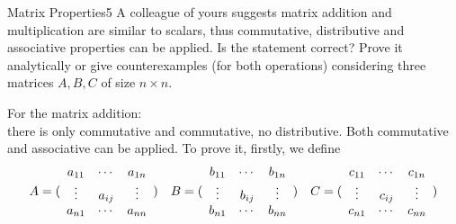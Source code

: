 \newif\ifvimbug
\vimbugfalse

\ifvimbug

\fi

 

\begin{questions}


\begin{question}{Matrix Properties}{5}
A colleague of yours suggests matrix addition and multiplication are similar to scalars, 
thus commutative, distributive and associative properties can be applied.
Is the statement correct? 
Prove it analytically or give counterexamples (for both operations) 
considering three matrices $ A, B, C$ of size $n\times n$.

\begin{answer}\end{answer}
    For the matrix addition:\\
    there is only commutative and commutative, no distributive.
    Both commutative and associative can be applied. To prove it, firstly, we define\\
    \begin{align*}
        A = ( \begin{array}{c c c} 
            a_{11} & \cdots & a_{1n} \\
            \vdots & a_{ij} & \vdots \\ 
            a_{n1} & \cdots & a_{nn} \end{array} )  \quad
        B = ( \begin{array}{c c c} 
            b_{11} & \cdots & b_{1n} \\
            \vdots & b_{ij} & \vdots \\
            b_{n1} & \cdots & b_{nn} \end{array} )  \quad
        C = ( \begin{array}{c c c} 
            c_{11} & \cdots & c_{1n} \\
            \vdots & c_{ij} & \vdots \\
            c_{n1} & \cdots & c_{nn} \end{array} )
    \end{align*}
    

\end{question}
\end{questions}
